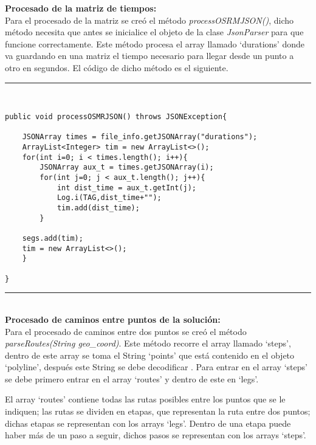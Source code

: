 \vspace{0.06in}
\textbf{Procesado de la matriz de tiempos:}\\
Para el procesado de la matriz se creó el método \textit{processOSRMJSON()}, dicho método necesita que antes se inicialice el objeto de la clase \textit{JsonParser} para que funcione correctamente.
Este método procesa el array llamado \enquote*{durations} donde va guardando en una matriz el tiempo necesario para llegar desde un punto a otro en segundos. El código de dicho método es el siguiente.
\newpage
\noindent\rule[-1ex]{\textwidth}{1pt}\\
\begin{lstlisting}[caption=Función para procesar matriz de tiempos entre puntos.]
public void processOSMRJSON() throws JSONException{

	JSONArray times = file_info.getJSONArray("durations");
	ArrayList<Integer> tim = new ArrayList<>();
	for(int i=0; i < times.length(); i++){
		JSONArray aux_t = times.getJSONArray(i);
		for(int j=0; j < aux_t.length(); j++){
			int dist_time = aux_t.getInt(j);
			Log.i(TAG,dist_time+"");
			tim.add(dist_time);
		}
	
	segs.add(tim);
	tim = new ArrayList<>();
	}

}
\end{lstlisting}
\noindent\rule[-1ex]{\textwidth}{1pt}\\

\vspace{0.06in}
\textbf{Procesado de caminos entre puntos de la solución:}\\
Para el procesado de caminos entre dos puntos se creó el método \textit{parseRoutes(String geo\_coord)}. Este método recorre el array llamado \enquote*{steps}, dentro de este array se toma el String \enquote*{points} que está contenido en el objeto \enquote*{polyline}, después este String se debe decodificar \cite{decode_polyline}. Para entrar en el array \enquote*{steps} se debe primero entrar en el array \enquote*{routes} y dentro de este en \enquote*{legs}.\newline

El array \enquote*{routes} contiene todas las rutas posibles entre los puntos que se le indiquen; las rutas se dividen en etapas, que representan la ruta entre dos puntos; dichas etapas se representan con los arrays \enquote*{legs}. Dentro de una etapa puede haber más de un paso a seguir, dichos pasos se representan con los arrays \enquote*{steps}.\newline

